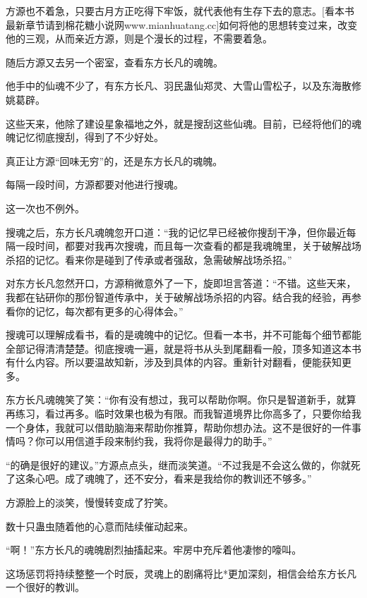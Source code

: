 
\begin{this_body}

方源也不着急，只要古月方正吃得下牢饭，就代表他有生存下去的意志。[看本书最新章节请到棉花糖小说网www.mianhuatang.cc]如何将他的思想转变过来，改变他的三观，从而亲近方源，则是个漫长的过程，不需要着急。

随后方源又去另一个密室，查看东方长凡的魂魄。

他手中的仙魂不少了，有东方长凡、羽民蛊仙郑灵、大雪山雪松子，以及东海散修姚葛辟。

这些天来，他除了建设星象福地之外，就是搜刮这些仙魂。目前，已经将他们的魂魄记忆彻底搜刮，得到了不少好处。

真正让方源“回味无穷”的，还是东方长凡的魂魄。

每隔一段时间，方源都要对他进行搜魂。

这一次也不例外。

搜魂之后，东方长凡魂魄忽开口道：“我的记忆早已经被你搜刮干净，但你最近每隔一段时间，都要对我再次搜魂，而且每一次查看的都是我魂魄里，关于破解战场杀招的记忆。看来你是碰到了传承或者强敌，急需破解战场杀招。”

对东方长凡忽然开口，方源稍微意外了一下，旋即坦言答道：“不错。这些天来，我都在钻研你的那份智道传承中，关于破解战场杀招的内容。结合我的经验，再参看你的记忆，每次都有更多的心得体会。”

搜魂可以理解成看书，看的是魂魄中的记忆。但看一本书，并不可能每个细节都能全部记得清清楚楚。彻底搜魂一遍，就是将书从头到尾翻看一般，顶多知道这本书有什么内容。所以要温故知新，涉及到具体的内容。重新针对翻看，便能获知更多。

东方长凡魂魄笑了笑：“你有没有想过，我可以帮助你啊。你只是智道新手，就算再练习，看过再多。临时效果也极为有限。而我智道境界比你高多了，只要你给我一个身体，我就可以借助脑海来帮助你推算，帮助你想办法。这不是很好的一件事情吗？你可以用信道手段来制约我，我将你是最得力的助手。”

“的确是很好的建议。”方源点点头，继而淡笑道。“不过我是不会这么做的，你就死了这条心吧。成了魂魄了，还不安分，看来是我给你的教训还不够多。”

方源脸上的淡笑，慢慢转变成了狞笑。

数十只蛊虫随着他的心意而陆续催动起来。

“啊！”东方长凡的魂魄剧烈抽搐起来。牢房中充斥着他凄惨的嚎叫。

这场惩罚将持续整整一个时辰，灵魂上的剧痛将比*更加深刻，相信会给东方长凡一个很好的教训。


\end{this_body}
